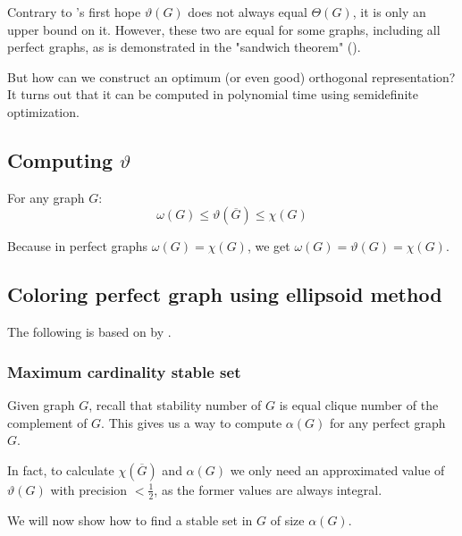 Contrary to \Lovasz's first hope \cite{Lovasz1979} $\vartheta(G)$ does not always equal $\Theta(G)$, it is only an upper bound on it. However, these two are equal for some graphs, including all perfect graphs, as is demonstrated in the \Lovasz "sandwich theorem" ().

But how can we construct an optimum (or even good) orthogonal representation? It turns out that it can be computed in polynomial time using semidefinite optimization.

\subsection{Computing \boldmath$\vartheta$}



\begin{theorem}
  \label{thm:sandwich}
  For any graph $G$:
  $$ \omega(G) \leq \vartheta(\overline{G}) \leq \chi(G) $$
\end{theorem}

Because in perfect graphs $\omega(G) = \chi(G)$, we get $\omega(G) = \vartheta(G) = \chi(G)$.


\subsection{Coloring perfect graph using ellipsoid method}
\label{sec:coloringEllipsoid}
The following is based on  by \citeauthor{Laurent2005} \cite{Laurent2005}.

\subsubsection{Maximum cardinality stable set}

Given graph $G$, recall that stability number of $G$ is equal clique number of the complement of $G$. This gives us a way to compute $\alpha(G)$ for any perfect graph $G$.

In fact, to calculate $\chi(\overline{G})$ and $\alpha(G)$ we only need an approximated value of $\vartheta(G)$ with precision $< \frac{1}{2}$, as the former values are always integral.

We will now show how to find a stable set in $G$ of size $\alpha(G)$.

